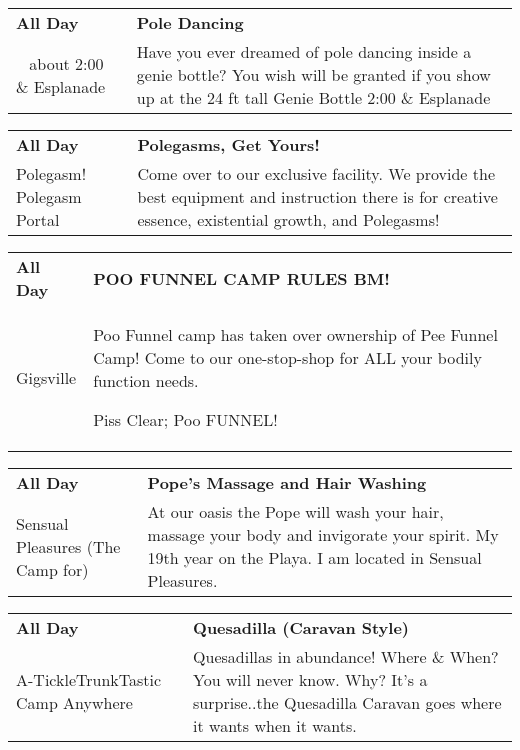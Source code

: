 \begin{tabular}{ p{1in} p{2.2in} }
    \textbf{All Day} & \textbf{Pole Dancing} \\
    ~ \newline about 2:00 \& Esplanade & Have you ever dreamed of pole dancing inside a genie bottle? You wish will be granted if you show up at the 24 ft tall Genie Bottle 2:00 \& Esplanade \\
    \hline 
\end{tabular}
    
\begin{tabular}{ p{1in} p{2.2in} }
    \textbf{All Day} & \textbf{Polegasms, Get Yours!} \\
    Polegasm! \newline Polegasm Portal & Come over to our exclusive facility. We provide the best equipment and instruction there is for creative essence, existential growth, and Polegasms! \\
    \hline 
\end{tabular}
    
\begin{tabular}{ p{1in} p{2.2in} }
    \textbf{All Day} & \textbf{POO FUNNEL CAMP RULES BM!} \\
    Gigsville \newline  & Poo Funnel camp has taken over ownership of Pee Funnel Camp! Come to our one-stop-shop for ALL your bodily function needs.

Piss Clear;
Poo FUNNEL! \\
    \hline 
\end{tabular}
    
\begin{tabular}{ p{1in} p{2.2in} }
    \textbf{All Day} & \textbf{Pope's Massage and Hair Washing} \\
    Sensual Pleasures (The Camp for) \newline  & At our oasis the Pope will wash your hair, massage your body and invigorate your spirit. My 19th year on the Playa. I am located in Sensual Pleasures. \\
    \hline 
\end{tabular}
    
\begin{tabular}{ p{1in} p{2.2in} }
    \textbf{All Day} & \textbf{Quesadilla (Caravan Style)} \\
    A-TickleTrunkTastic Camp \newline Anywhere & Quesadillas in abundance! Where \& When? You will never know. Why? It's a surprise..the Quesadilla Caravan goes where it wants when it wants. \\
    \hline 
\end{tabular}
    
